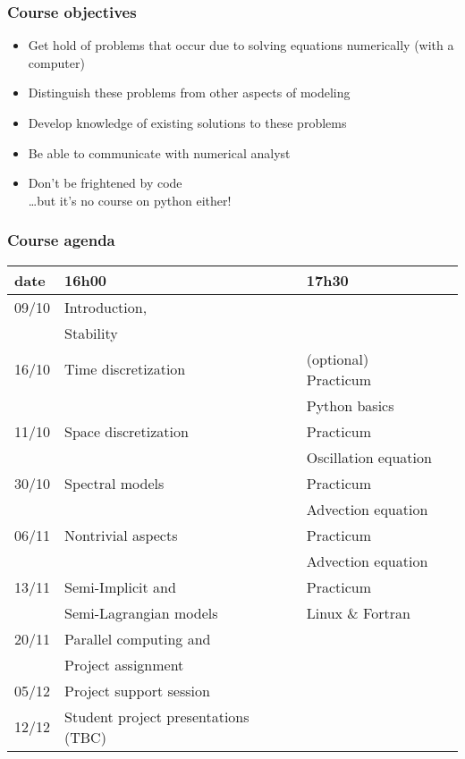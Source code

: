 \documentclass[aspectratio=43,9pt]{beamer}
\begin{document}
%
%
\begin{frame}
	\frametitle{Course objectives}
	\begin{itemize}
		\item Get hold of problems that occur due to solving equations numerically (with a computer)\\[3ex]
\pause
		\item Distinguish these problems from other aspects of modeling
		\item Develop knowledge of existing solutions to these problems
		\item Be able to communicate with numerical analyst\\[3ex]
\pause
		\item Don't be frightened by code\\ \quad\ldots but it's no course on python either!
	\end{itemize}
\end{frame}
%
%
\begin{frame}
	\frametitle{Course agenda}
	\vspace*{-5mm}
	\begin{center}
		\def\arraystretch{1.3}
		\begin{tabular}{l|lll}
			date	&	16h00	&	17h30 \\
		\hline
			09/10 	& Introduction, \\[-4pt]
					& Stability	\\
			16/10	& Time discretization		&	(optional) Practicum	\\[-4pt]
					&							&	Python basics			\\
			11/10	& Space discretization		&	Practicum				\\[-4pt]
					& 							&	Oscillation equation	\\
			30/10	& Spectral models			& 	Practicum				\\[-4pt]
					&							&	Advection equation 		\\
			06/11	& Nontrivial aspects		&	Practicum				\\[-4pt]
					& 							&	Advection equation		\\
			13/11	& Semi-Implicit and		 	&	Practicum				\\[-4pt]
					& Semi-Lagrangian models	&	Linux \& Fortran		\\
			20/11	& Parallel computing and	&							\\[-4pt]
					& Project assignment		&							\\
		\hline
			05/12	& Project support session	\\
			12/12	& Student project presentations (TBC)
		\end{tabular}
		\def\arraystretch{1}
	\end{center}
\end{frame}
\end{document}

